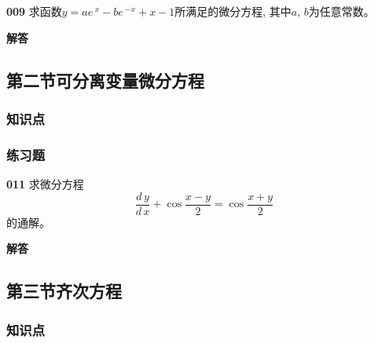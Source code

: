 \documentclass[a4paper,10pt]{article} %
\begin{document}


\textheight


\par\noindent \textbf{009} \quad 求函数$y=ae\,^x-be\,^{-x}+x-1$所满足的微分方程, 其中$a$, $b$为任意常数。
\par\noindent \textbf{ 解答}





% 
\newpage




\newpage
\subsection{第二节\quad 可分离变量微分方程}
\subsubsection{知识点}
\subsubsection{练习题}


\par\noindent \textbf{011} \quad 求微分方程
$$\frac{d\,y}{d\,x}+\cos \frac{x-y}{2}=\cos \frac{x+y}{2}$$
的通解。
\par\noindent \textbf{ 解答}




\newpage
\subsection{第三节\quad 齐次方程}
\subsubsection{知识点}
\end{document}
